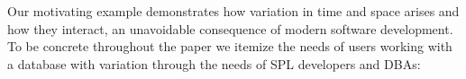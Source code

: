 
Our motivating example demonstrates how variation in time and space
arises and how they interact, an unavoidable consequence of modern software
development.
To be concrete throughout the paper we itemize
the needs of users working with a database with variation
through the needs of SPL developers and DBAs:
%

